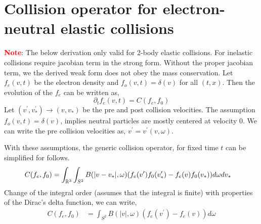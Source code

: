 \documentclass{article}
\begin{document}


\section{Collision operator for electron-neutral elastic collisions}
\label{sec:electron_neutral_pc}
\textcolor{red}{\textbf{Note}}: The below derivation only valid for 2-body elastic collisions. For inelastic collisions require jacobian term in the strong form. Without the proper jacobian term, we the derived weak form does not obey the mass conservation. 
Let $f_e(v,t)$ be the electron density and $f_o(v,t)=\delta(v)$ for all $(t,x)$. Then the evolution of the $f_e$ can be written as, 
\begin{equation}
    \partial_t f_e(v,t) = C(f_e,f_0)
\end{equation}
Let $(v^\prime,v_*^\prime) \rightarrow (v,v_*)$ be the pre and post collision velocities. The assumption $f_o(v,t)=\delta(v)$, implies neutral particles are mostly centered at velocity $0$. We can write the pre collision velocities as, $v^\prime=v^\prime(v,\omega)$. 

With these assumptions, the generic collision operator, for fixed time $t$ can be simplified for follows. 
\begin{align}
    C(f_e,f_0) &= \int_{\mathbb{R}^3}\int_{S^2} B(|v-v_*|,\omega)(f_e(v^\prime)f_0(v_*^\prime) - f_e(v)f_0(v_*) ) d\omega dv_*
\end{align}
Change of the integral order (assumes that the integral is finite) with properties of the Dirac's delta function, we can write, 
\begin{align}
    C(f_e,f_0) &= \int_{S^2} B(|v|,\omega)(f_e(v^\prime) - f_e(v)) d\omega
\end{align}
\end{document}
